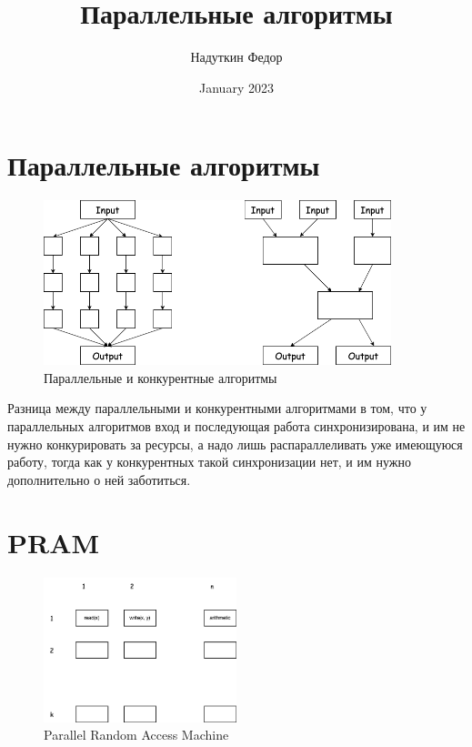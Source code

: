 \documentclass[11pt]{article}
\title{Параллельные алгоритмы}
\author{Надуткин Федор }
\date{January 2023}
\begin{document}
    \maketitle
    \newpage

    \section*{Параллельные алгоритмы}

    \begin{figure}[h!]
        \includegraphics*[width=0.9\textwidth]{Pictures/Parallel and Concurrent Algorithms}
        \caption{Параллельные и конкурентные алгоритмы}
        \label{fig:parallel_and_concurrent}
    \end{figure}

    Разница между параллельными и конкурентными алгоритмами в том,
    что у параллельных алгоритмов вход и последующая работа синхронизирована, и им не нужно конкурировать за ресурсы,
    а надо лишь распараллеливать уже имеющуюся работу,
    тогда как у конкурентных такой синхронизации нет, и им нужно дополнительно о ней заботиться.

    \section*{PRAM}

    \begin{figure}[h!]
        \centering
        \includegraphics*[width=0.5\textwidth]{Pictures/PRAM/PRAM}
        \caption{Parallel Random Access Machine}
        \label{fig:pram}
    \end{figure}
\end{document}
